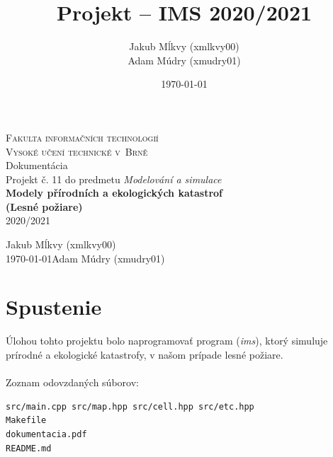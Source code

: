 \documentclass[a4paper,12pt]{article}
\author{Jakub Mĺkvy (xmlkvy00)\\Adam Múdry (xmudry01)}
\date{\today}
\title{\Large\bf Projekt -- IMS 2020/2021}
\begin{document}
\begin{titlepage}
	\begin{center}
	    \vspace*{+3cm}
		\Huge
		\textsc{Fakulta informačních technologií\\
		\huge Vysoké učení technické v~Brně}\\
	    {\LARGE{Dokumentácia\\Projekt č. 11 do predmetu \textit{Modelování a simulace}\\
		 \vspace{4mm}
		 \Huge\textbf{{Modely přírodních a ekologických katastrof\\(Lesné požiare)}}\\
		 \vspace{4mm}
		 2020/2021
		 }}
		 
	\end{center}
	{\Large \hfill Jakub Mĺkvy (xmlkvy00)\\
	\today \hfill Adam Múdry (xmudry01)}
	
	\thispagestyle{empty}
    \setcounter{page}{0}
\end{titlepage}

\newpage

\tableofcontents

\newpage
\section{Spustenie}
Úlohou tohto projektu bolo naprogramovať program (\textit{ims}), ktorý simuluje prírodné a ekologické katastrofy, v našom prípade lesné požiare.
\\
\\
Zoznam odovzdaných súborov: 
\begin{lstlisting}
src/main.cpp src/map.hpp src/cell.hpp src/etc.hpp
Makefile
dokumentacia.pdf
README.md
\end{lstlisting}
\end{document}
